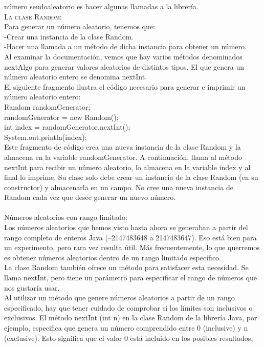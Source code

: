 \documentclass[11pt,a4paper]{article}
\begin{document}
	 número seudoaleatorio es hacer algunas llamadas a la librería.\\
	 \textsc{La clase Random:}\\
	 Para generar un número aleatorio, tenemos que:\\
	 -Crear una instancia de la clase Random.\\
	 -Hacer una llamada a un método de dicha instancia para obtener un número.\\
	 Al examinar la documentación, vemos que hay varios métodos denominados nextAlgo para generar
	 valores aleatorios de distintos tipos. El que genera un número aleatorio entero se denomina
	 nextInt.\\
	 El siguiente fragmento ilustra el código necesario para generar e imprimir un número aleatorio
	 entero:\\
	 Random randomGenerator;\\
	 randomGenerator = new Random();\\
	 int index = randomGenerator.nextInt();\\
	 System.out.println(index);\\
	Este fragmento de código crea una nueva instancia de la clase Random y la almacena en la variable
	randomGenerator. A continuación, llama al método nextInt para recibir un número aleatorio,
	lo almacena en la variable index y al final lo imprime. Su clase solo debe crear un instancia de la clase Random (en su constructor) y almacenarla en un
	campo. No cree una nueva instancia de Random cada vez que desee generar un nuevo número.\\
	\\
	Números aleatorios con rango limitado:\\
	Los números aleatorios que hemos visto hasta ahora se generaban a partir del rango completo
	de enteros Java (–2147483648 a 2147483647). Eso está bien para un experimento, pero rara vez
	resulta útil. Más frecuentemente, lo que querremos es obtener números aleatorios dentro de un
	rango limitado específico.\\
	La clase Random también ofrece un método para satisfacer esta necesidad. Se llama nextInt,
	pero tiene un parámetro para especificar el rango de números que nos gustaría usar.\\
	Al utilizar un método que genere números aleatorios a partir de un rango especificado, hay que
	tener cuidado de comprobar si los límites son inclusivos o exclusivos. El método nextInt (int n)
	en la clase Random de la librería Java, por ejemplo, especifica que genera un número comprendido entre 0 (inclusive) y n (exclusive). Esto significa que el valor 0 está incluido en los posibles resultados,
\end{document}
